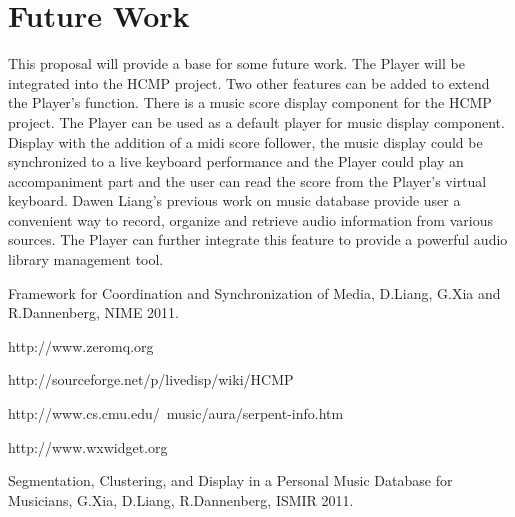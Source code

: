 \documentclass[12pt]{article} %
\begin{document}
\section{Future Work}
This proposal will provide a base for some future work. The Player will  
be integrated into the HCMP project. Two other features can be
added to extend the Player's function. There is a music score display component for the HCMP project. The Player can 
be used as a default player for music display component. Display with the addition of a midi 
score follower, the music display could be synchronized to a live keyboard performance and the Player could play 
an accompaniment part and the user can 
read the score from the Player's virtual keyboard. Dawen Liang's previous work 
\cite{Dawen:ISMIR2011}on music database provide user a convenient way to record, organize
and retrieve audio information from various sources. The Player can further integrate 
this feature to provide a powerful audio library management tool. 



\begin{thebibliography}{99} %

Framework for Coordination and Synchronization of Media, D.Liang, G.Xia and R.Dannenberg, NIME 2011.

http://www.zeromq.org

http://sourceforge.net/p/livedisp/wiki/HCMP%

http://www.cs.cmu.edu/~music/aura/serpent-info.htm

http://www.wxwidget.org

Segmentation, Clustering, and Display in a Personal Music Database for Musicians,
G.Xia, D.Liang, R.Dannenberg, ISMIR 2011.

\end{thebibliography}

\end{document}
